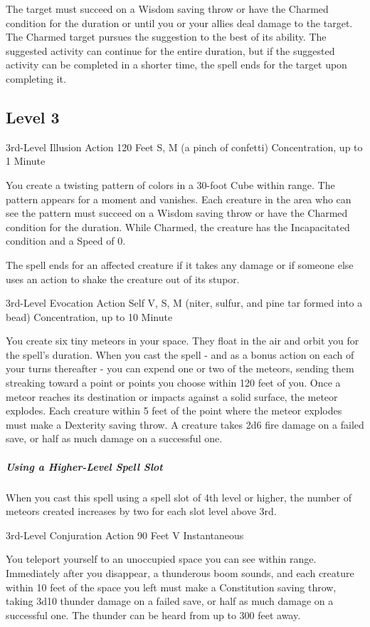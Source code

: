 \documentclass[letterpaper,openany,oneside,twocolumn]{book}
\begin{document}
The target must succeed on a Wisdom saving throw or have the Charmed condition for the duration or until you or your allies deal damage to the target. The Charmed target pursues the suggestion to the best of its ability. The suggested activity can continue for the entire duration, but if the suggested activity can be completed in a shorter time, the spell ends for the target upon completing it.

\subsection*{Level 3}
	{3rd-Level Illusion}
	{Action}
	{120 Feet}
	{S, M (a pinch of confetti)}
	{Concentration, up to 1 Minute}

You create a twisting pattern of colors in a 30-foot Cube within range. The pattern appears for a moment and vanishes. Each creature in the area who can see the pattern must succeed on a Wisdom saving throw or have the Charmed condition for the duration. While Charmed, the creature has the Incapacitated condition and a Speed of 0.

The spell ends for an affected creature if it takes any damage or if someone else uses an action to shake the creature out of its stupor.

	{3rd-Level Evocation}
	{Action}
	{Self}
	{V, S, M (niter, sulfur, and pine tar formed into a bead)}
	{Concentration, up to 10 Minute}

You create six tiny meteors in your space. They float in the air and orbit you for the spell's duration. When you cast the spell - and as a bonus action on each of your turns thereafter - you can expend one or two of the meteors, sending them streaking toward a point or points you choose within 120 feet of you. Once a meteor reaches its destination or impacts against a solid surface, the meteor explodes. Each creature within 5 feet of the point where the meteor explodes must make a Dexterity saving throw. A creature takes 2d6 fire damage on a failed save, or half as much damage on a successful one.

\subparagraph*{Using a Higher-Level Spell Slot} When you cast this spell using a spell slot of 4th level or higher, the number of meteors created increases by two for each slot level above 3rd.

	{3rd-Level Conjuration}
	{Action}
	{90 Feet}
	{V}
	{Instantaneous}

You teleport yourself to an unoccupied space you can see within range. Immediately after you disappear, a thunderous boom sounds, and each creature within 10 feet of the space you left must make a Constitution saving throw, taking 3d10 thunder damage on a failed save, or half as much damage on a successful one. The thunder can be heard from up to 300 feet away.
\end{document}
